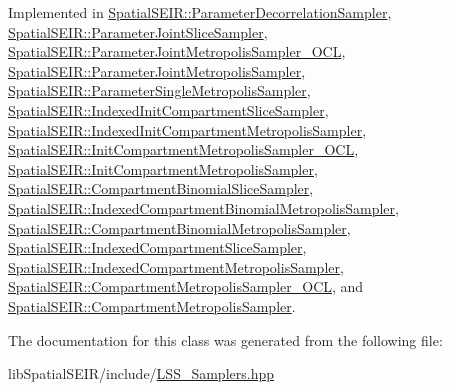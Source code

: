 Implemented in \hyperlink{classSpatialSEIR_1_1ParameterDecorrelationSampler_ad3039ef7f917ec85fc210be2940b5da1}{Spatial\-S\-E\-I\-R\-::\-Parameter\-Decorrelation\-Sampler}, \hyperlink{classSpatialSEIR_1_1ParameterJointSliceSampler_ac435f72bd91e0585b45d42233b0741dc}{Spatial\-S\-E\-I\-R\-::\-Parameter\-Joint\-Slice\-Sampler}, \hyperlink{classSpatialSEIR_1_1ParameterJointMetropolisSampler__OCL_a1049eea747bcdaa8112defcc52a651d5}{Spatial\-S\-E\-I\-R\-::\-Parameter\-Joint\-Metropolis\-Sampler\-\_\-\-O\-C\-L}, \hyperlink{classSpatialSEIR_1_1ParameterJointMetropolisSampler_a5684e2933ff1fab50e1761450ba41897}{Spatial\-S\-E\-I\-R\-::\-Parameter\-Joint\-Metropolis\-Sampler}, \hyperlink{classSpatialSEIR_1_1ParameterSingleMetropolisSampler_a0576cfdda14e0afb0f63413f01a82c13}{Spatial\-S\-E\-I\-R\-::\-Parameter\-Single\-Metropolis\-Sampler}, \hyperlink{classSpatialSEIR_1_1IndexedInitCompartmentSliceSampler_a8687c4d1acc384cc4e8d7f4b91db79a5}{Spatial\-S\-E\-I\-R\-::\-Indexed\-Init\-Compartment\-Slice\-Sampler}, \hyperlink{classSpatialSEIR_1_1IndexedInitCompartmentMetropolisSampler_af2891523864f89b9587205eaba4bd41a}{Spatial\-S\-E\-I\-R\-::\-Indexed\-Init\-Compartment\-Metropolis\-Sampler}, \hyperlink{classSpatialSEIR_1_1InitCompartmentMetropolisSampler__OCL_a932637bc74c6f2f5fc251dd4a81131ae}{Spatial\-S\-E\-I\-R\-::\-Init\-Compartment\-Metropolis\-Sampler\-\_\-\-O\-C\-L}, \hyperlink{classSpatialSEIR_1_1InitCompartmentMetropolisSampler_ad64b5ae0943c980f752c49f9c179a3b7}{Spatial\-S\-E\-I\-R\-::\-Init\-Compartment\-Metropolis\-Sampler}, \hyperlink{classSpatialSEIR_1_1CompartmentBinomialSliceSampler_a35f2ba8531217f1fa227da3b801d05dd}{Spatial\-S\-E\-I\-R\-::\-Compartment\-Binomial\-Slice\-Sampler}, \hyperlink{classSpatialSEIR_1_1IndexedCompartmentBinomialMetropolisSampler_a2ce0af7bb2a881f254dfbd97584704bd}{Spatial\-S\-E\-I\-R\-::\-Indexed\-Compartment\-Binomial\-Metropolis\-Sampler}, \hyperlink{classSpatialSEIR_1_1CompartmentBinomialMetropolisSampler_aa84f51d4d02943be01c6309581ecc17a}{Spatial\-S\-E\-I\-R\-::\-Compartment\-Binomial\-Metropolis\-Sampler}, \hyperlink{classSpatialSEIR_1_1IndexedCompartmentSliceSampler_aeeeeb33f86bf684e6e44914c784847e6}{Spatial\-S\-E\-I\-R\-::\-Indexed\-Compartment\-Slice\-Sampler}, \hyperlink{classSpatialSEIR_1_1IndexedCompartmentMetropolisSampler_a87fe511f9a9fd517c4bafad59c296986}{Spatial\-S\-E\-I\-R\-::\-Indexed\-Compartment\-Metropolis\-Sampler}, \hyperlink{classSpatialSEIR_1_1CompartmentMetropolisSampler__OCL_a15b18cebae437f578fbf15aa8cfbdf94}{Spatial\-S\-E\-I\-R\-::\-Compartment\-Metropolis\-Sampler\-\_\-\-O\-C\-L}, and \hyperlink{classSpatialSEIR_1_1CompartmentMetropolisSampler_a249b461e6f848c20f274bac7cae76e95}{Spatial\-S\-E\-I\-R\-::\-Compartment\-Metropolis\-Sampler}.



The documentation for this class was generated from the following file\-:\begin{DoxyCompactItemize}
\item 
lib\-Spatial\-S\-E\-I\-R/include/\hyperlink{LSS__Samplers_8hpp}{L\-S\-S\-\_\-\-Samplers.\-hpp}\end{DoxyCompactItemize}
